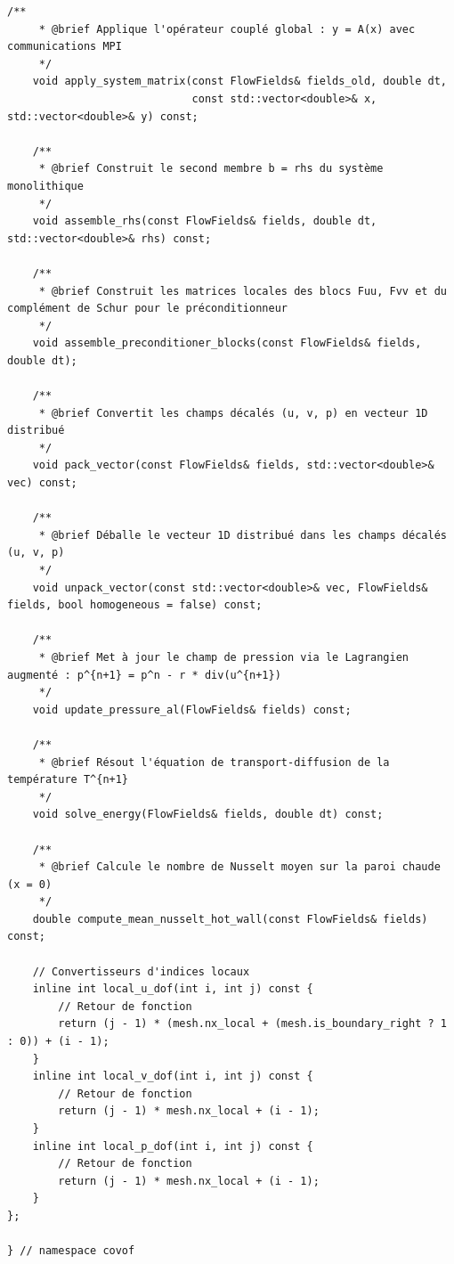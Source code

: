 \documentclass[10pt,a4paper,oneside]{book}
\begin{document}
\begin{lstlisting}[language={[11]C++}]
    /**
     * @brief Applique l'opérateur couplé global : y = A(x) avec communications MPI
     */
    void apply_system_matrix(const FlowFields& fields_old, double dt,
                             const std::vector<double>& x, std::vector<double>& y) const;

    /**
     * @brief Construit le second membre b = rhs du système monolithique
     */
    void assemble_rhs(const FlowFields& fields, double dt, std::vector<double>& rhs) const;

    /**
     * @brief Construit les matrices locales des blocs Fuu, Fvv et du complément de Schur pour le préconditionneur
     */
    void assemble_preconditioner_blocks(const FlowFields& fields, double dt);

    /**
     * @brief Convertit les champs décalés (u, v, p) en vecteur 1D distribué
     */
    void pack_vector(const FlowFields& fields, std::vector<double>& vec) const;

    /**
     * @brief Déballe le vecteur 1D distribué dans les champs décalés (u, v, p)
     */
    void unpack_vector(const std::vector<double>& vec, FlowFields& fields, bool homogeneous = false) const;

    /**
     * @brief Met à jour le champ de pression via le Lagrangien augmenté : p^{n+1} = p^n - r * div(u^{n+1})
     */
    void update_pressure_al(FlowFields& fields) const;

    /**
     * @brief Résout l'équation de transport-diffusion de la température T^{n+1}
     */
    void solve_energy(FlowFields& fields, double dt) const;

    /**
     * @brief Calcule le nombre de Nusselt moyen sur la paroi chaude (x = 0)
     */
    double compute_mean_nusselt_hot_wall(const FlowFields& fields) const;

    // Convertisseurs d'indices locaux
    inline int local_u_dof(int i, int j) const {
        // Retour de fonction
        return (j - 1) * (mesh.nx_local + (mesh.is_boundary_right ? 1 : 0)) + (i - 1);
    }
    inline int local_v_dof(int i, int j) const {
        // Retour de fonction
        return (j - 1) * mesh.nx_local + (i - 1);
    }
    inline int local_p_dof(int i, int j) const {
        // Retour de fonction
        return (j - 1) * mesh.nx_local + (i - 1);
    }
};

} // namespace covof

\end{lstlisting}
\end{document}

